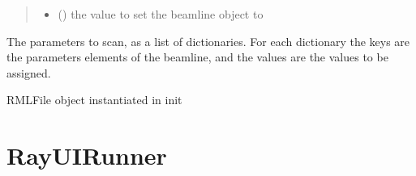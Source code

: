 \documentclass[letterpaper,10pt,english]{sphinxmanual}
\begin{document}
\begin{fulllineitems}
\begin{fulllineitems}
\begin{quote}
\begin{description}
\begin{itemize}
\item {} 
\sphinxAtStartPar
{} (\sphinxstyleliteralemphasis{\sphinxupquote{,}}\sphinxstyleliteralemphasis{\sphinxupquote{,}}) \textendash{} the value to set the beamline object to

\end{itemize}

\end{description}\end{quote}

\end{fulllineitems}


\begin{fulllineitems}
\label{\detokenize{index:raypyng.simulate.SimulationParams.params}}
\pysigstartsignatures
{}
\pysigstopsignatures
\sphinxAtStartPar
The parameters to scan, as a list of dictionaries.
For each dictionary the keys are the parameters elements of the beamline, and the values are the
values to be assigned.

\end{fulllineitems}


\begin{fulllineitems}
\label{\detokenize{index:raypyng.simulate.SimulationParams.rml}}
\pysigstartsignatures
{}
\pysigstopsignatures
\sphinxAtStartPar
RMLFile object instantiated in init

\end{fulllineitems}


\end{fulllineitems}



\chapter{RayUIRunner}
\label{\detokenize{index:rayuirunner}}
\end{document}

